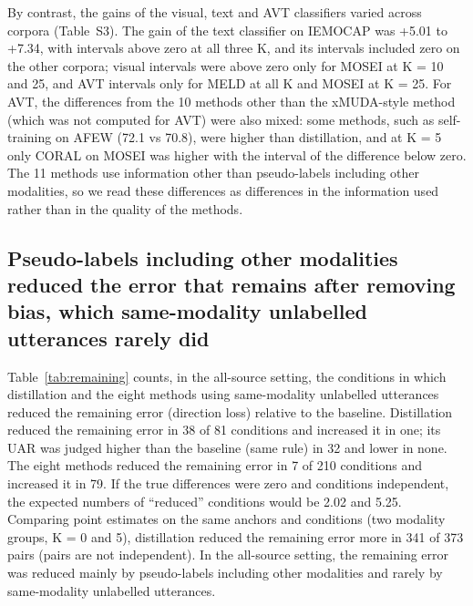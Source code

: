 By contrast, the gains of the visual, text and AVT classifiers varied across corpora (Table~S3). The gain of the text classifier on IEMOCAP was +5.01 to +7.34\pt, with intervals above zero at all three K, and its intervals included zero on the other corpora; visual intervals were above zero only for MOSEI at K = 10 and 25, and AVT intervals only for MELD at all K and MOSEI at K = 25. For AVT, the differences from the 10 methods other than the xMUDA-style method (which was not computed for AVT) were also mixed: some methods, such as self-training on AFEW (72.1 vs 70.8), were higher than distillation, and at K = 5 only CORAL on MOSEI was higher with the interval of the difference below zero. The 11 methods use information other than pseudo-labels including other modalities, so we read these differences as differences in the information used rather than in the quality of the methods.

\subsection{Pseudo-labels including other modalities reduced the error that remains after removing bias, which same-modality unlabelled utterances rarely did}\label{sec:res-remaining}
Table~\ref{tab:remaining} counts, in the all-source setting, the conditions in which distillation and the eight methods using same-modality unlabelled utterances reduced the remaining error (direction loss) relative to the baseline. Distillation reduced the remaining error in 38 of 81 conditions and increased it in one; its UAR was judged higher than the baseline (same rule) in 32 and lower in none. The eight methods reduced the remaining error in 7 of 210 conditions and increased it in 79. If the true differences were zero and conditions independent, the expected numbers of ``reduced'' conditions would be 2.02 and 5.25. Comparing point estimates on the same anchors and conditions (two modality groups, K = 0 and 5), distillation reduced the remaining error more in 341 of 373 pairs (pairs are not independent). In the all-source setting, the remaining error was reduced mainly by pseudo-labels including other modalities and rarely by same-modality unlabelled utterances.


